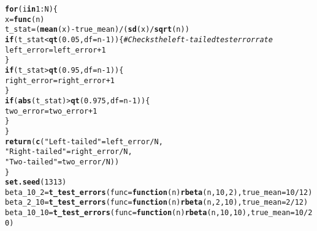 \documentclass{article}\usepackage[]{graphicx}\usepackage[]{xcolor}
\makeatletter
\newcommand{\hlnum}[1]{\textcolor[rgb]{0.686,0.059,0.569}{#1}}%
\newcommand{\hlsng}[1]{\textcolor[rgb]{0.192,0.494,0.8}{#1}}%
\newcommand{\hlcom}[1]{\textcolor[rgb]{0.678,0.584,0.686}{\textit{#1}}}%
\newcommand{\hlopt}[1]{\textcolor[rgb]{0,0,0}{#1}}%
\newcommand{\hldef}[1]{\textcolor[rgb]{0.345,0.345,0.345}{#1}}%
\newcommand{\hlkwa}[1]{\textcolor[rgb]{0.161,0.373,0.58}{\textbf{#1}}}%
\newcommand{\hlkwb}[1]{\textcolor[rgb]{0.69,0.353,0.396}{#1}}%
\newcommand{\hlkwc}[1]{\textcolor[rgb]{0.333,0.667,0.333}{#1}}%
\newcommand{\hlkwd}[1]{\textcolor[rgb]{0.737,0.353,0.396}{\textbf{#1}}}%
\newenvironment{kframe}{%
 \def\at@end@of@kframe{}%
 \ifinner\ifhmode%
  \def\at@end@of@kframe{\end{minipage}}%
  \begin{minipage}{\columnwidth}%
 \fi\fi%
 \def\FrameCommand##1{\hskip\@totalleftmargin \hskip-\fboxsep
 \colorbox{shadecolor}{##1}\hskip-\fboxsep
     \hskip-\linewidth \hskip-\@totalleftmargin \hskip\columnwidth}%
 \MakeFramed {\advance\hsize-\width
   \@totalleftmargin\z@ \linewidth\hsize
   \@setminipage}}%
 {\par\unskip\endMakeFramed%
 \at@end@of@kframe}
\newenvironment{knitrout}{}{} %
\makeatother
\begin{document}
\begin{enumerate}
\begin{knitrout}
\begin{kframe}
\begin{alltt}
  \hlkwa{for} \hldef{(i} \hlkwa{in} \hlnum{1}\hlopt{:}\hldef{N)\{}
    \hldef{x} \hlkwb{=} \hlkwd{func}\hldef{(n)}
    \hldef{t_stat} \hlkwb{=} \hldef{(}\hlkwd{mean}\hldef{(x)} \hlopt{-} \hldef{true_mean)} \hlopt{/} \hldef{(}\hlkwd{sd}\hldef{(x)} \hlopt{/} \hlkwd{sqrt}\hldef{(n))}
    \hlkwa{if} \hldef{(t_stat} \hlopt{<} \hlkwd{qt}\hldef{(}\hlnum{0.05}\hldef{,} \hlkwc{df} \hldef{= n} \hlopt{-} \hlnum{1}\hldef{))\{} \hlcom{# Checks the left-tailed test error rate}
      \hldef{left_error} \hlkwb{=} \hldef{left_error} \hlopt{+} \hlnum{1}
    \hldef{\}}
    \hlkwa{if} \hldef{(t_stat} \hlopt{>} \hlkwd{qt}\hldef{(}\hlnum{0.95}\hldef{,} \hlkwc{df} \hldef{= n} \hlopt{-} \hlnum{1}\hldef{))\{}
      \hldef{right_error} \hlkwb{=} \hldef{right_error} \hlopt{+} \hlnum{1}
    \hldef{\}}
    \hlkwa{if}\hldef{(}\hlkwd{abs}\hldef{(t_stat)} \hlopt{>} \hlkwd{qt}\hldef{(}\hlnum{0.975}\hldef{,} \hlkwc{df} \hldef{= n} \hlopt{-} \hlnum{1}\hldef{))\{}
      \hldef{two_error} \hlkwb{=} \hldef{two_error} \hlopt{+} \hlnum{1}
    \hldef{\}}
  \hldef{\}}
  \hlkwd{return}\hldef{(}\hlkwd{c}\hldef{(}\hlsng{"Left-tailed"} \hldef{= left_error}\hlopt{/}\hldef{N,}
           \hlsng{"Right-tailed"} \hldef{= right_error}\hlopt{/}\hldef{N,}
           \hlsng{"Two-tailed"} \hldef{= two_error}\hlopt{/}\hldef{N))}
\hldef{\}}
\hlkwd{set.seed}\hldef{(}\hlnum{1313}\hldef{)}
\hldef{beta_10_2} \hlkwb{=} \hlkwd{t_test_errors}\hldef{(}\hlkwc{func} \hldef{=} \hlkwa{function}\hldef{(}\hlkwc{n}\hldef{)} \hlkwd{rbeta}\hldef{(n,} \hlnum{10}\hldef{,}\hlnum{2}\hldef{),} \hlkwc{true_mean} \hldef{=} \hlnum{10}\hlopt{/}\hlnum{12}\hldef{)}
\hldef{beta_2_10} \hlkwb{=} \hlkwd{t_test_errors}\hldef{(}\hlkwc{func} \hldef{=} \hlkwa{function}\hldef{(}\hlkwc{n}\hldef{)} \hlkwd{rbeta}\hldef{(n,} \hlnum{2}\hldef{,} \hlnum{10}\hldef{),} \hlkwc{true_mean} \hldef{=} \hlnum{2}\hlopt{/}\hlnum{12}\hldef{)}
\hldef{beta_10_10} \hlkwb{=} \hlkwd{t_test_errors}\hldef{(}\hlkwc{func} \hldef{=} \hlkwa{function}\hldef{(}\hlkwc{n}\hldef{)} \hlkwd{rbeta}\hldef{(n,} \hlnum{10}\hldef{,} \hlnum{10}\hldef{),} \hlkwc{true_mean} \hldef{=} \hlnum{10}\hlopt{/}\hlnum{20}\hldef{)}


\end{alltt}
\end{kframe}
\end{knitrout}
\end{enumerate}
\end{document}
